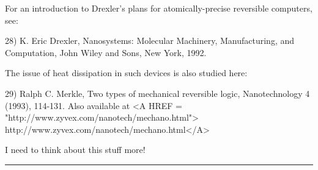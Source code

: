 For an introduction to Drexler's plans for atomically-precise
reversible computers, see:

28) K. Eric Drexler, Nanosystems: Molecular Machinery, Manufacturing, 
and Computation, John Wiley and Sons, New York, 1992.

The issue of heat dissipation in such devices is also studied here:

29) Ralph C. Merkle, Two types of mechanical reversible logic,
Nanotechnology 4 (1993), 114-131.  Also available at 
<A HREF = "http://www.zyvex.com/nanotech/mechano.html">
http://www.zyvex.com/nanotech/mechano.html</A>

I need to think about this stuff more!




\par\noindent\rule{\textwidth}{0.4pt}
